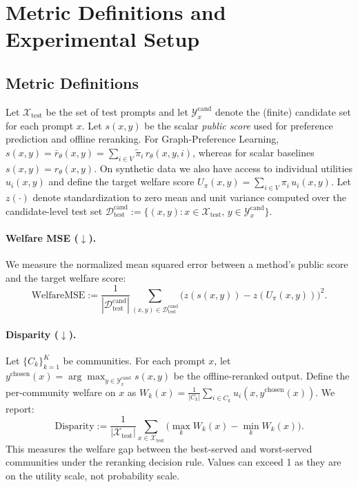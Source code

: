 \documentclass{article}
\theoremstyle{plain}
\theoremstyle{definition}
\theoremstyle{remark}
\begin{document}
\section{Metric Definitions and Experimental Setup}
\label{app:metrics}

\subsection{Metric Definitions}

Let $\mathcal{X}_{\text{test}}$ be the set of test prompts and let
$\mathcal{Y}^{\mathrm{cand}}_x$ denote the (finite) candidate set for each
prompt $x$. Let $s(x,y)$ be the scalar \emph{public score} used for preference
prediction and offline reranking. For Graph-Preference Learning,
$s(x,y)=\bar r_\theta(x,y)=\sum_{i\in V}\tilde\pi_i\,r_\theta(x,y,i)$, whereas
for scalar baselines $s(x,y)=r_\theta(x,y)$. On synthetic data we also have
access to individual utilities $u_i(x,y)$ and define the target welfare score
$U_\pi(x,y)=\sum_{i\in V}\pi_i\,u_i(x,y)$. Let $z(\cdot)$ denote standardization
to zero mean and unit variance computed over the candidate-level test set
$\mathcal{D}^{\mathrm{cand}}_{\text{test}}:=\{(x,y):x\in\mathcal{X}_{\text{test}},\,y\in\mathcal{Y}^{\mathrm{cand}}_x\}$.

\paragraph{Welfare MSE ($\downarrow$).}
We measure the normalized mean squared error between a method's public score
and the target welfare score:
\begin{equation}
\mathrm{WelfareMSE}
:=
\frac{1}{|\mathcal{D}^{\mathrm{cand}}_{\text{test}}|}
\sum_{(x,y)\in\mathcal{D}^{\mathrm{cand}}_{\text{test}}}
\big(z(s(x,y)) - z(U_\pi(x,y))\big)^2.
\end{equation}

\paragraph{Disparity ($\downarrow$).}
Let $\{C_k\}_{k=1}^K$ be communities. For each prompt $x$, let
$y^{\text{chosen}}(x)=\arg\max_{y\in \mathcal{Y}^{\mathrm{cand}}_x} s(x,y)$ be
the offline-reranked output. Define the per-community welfare on $x$ as
$W_k(x)=\frac{1}{|C_k|}\sum_{i\in C_k} u_i(x,y^{\text{chosen}}(x))$. We report:
\begin{equation}
\mathrm{Disparity}
:=
\frac{1}{|\mathcal{X}_{\text{test}}|}
\sum_{x\in\mathcal{X}_{\text{test}}}
\Big(\max_k W_k(x) - \min_k W_k(x)\Big).
\end{equation}
This measures the welfare gap between the best-served and worst-served
communities under the reranking decision rule. Values can exceed 1 as they are
on the utility scale, not probability scale.
\end{document}
